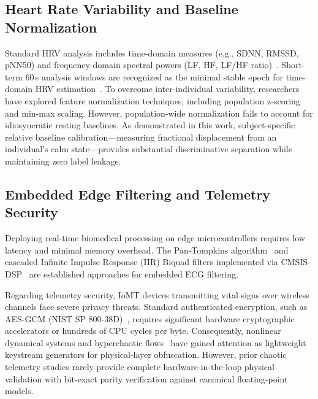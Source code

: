 \documentclass[conference]{IEEEtran}
\begin{document}
\subsection{Heart Rate Variability and Baseline Normalization}
Standard HRV analysis includes time-domain measures (e.g., SDNN, RMSSD, pNN50) and frequency-domain spectral powers (LF, HF, LF/HF ratio)~\cite{taskforce1996hrv,shaffer2017overview}. Short-term 60\,s analysis windows are recognized as the minimal stable epoch for time-domain HRV estimation~\cite{shaffer2017overview}. To overcome inter-individual variability, researchers have explored feature normalization techniques, including population z-scoring and min-max scaling. However, population-wide normalization fails to account for idiosyncratic resting baselines. As demonstrated in this work, subject-specific relative baseline calibration—measuring fractional displacement from an individual's calm state—provides substantial discriminative separation while maintaining zero label leakage.

\subsection{Embedded Edge Filtering and Telemetry Security}
Deploying real-time biomedical processing on edge microcontrollers requires low latency and minimal memory overhead. The Pan-Tompkins algorithm~\cite{pan1985realtime} and cascaded Infinite Impulse Response (IIR) Biquad filters implemented via CMSIS-DSP~\cite{arm2021cmsis} are established approaches for embedded ECG filtering. 

Regarding telemetry security, IoMT devices transmitting vital signs over wireless channels face severe privacy threats. Standard authenticated encryption, such as AES-GCM (NIST SP 800-38D)~\cite{dworkin2007recommendation}, requires significant hardware cryptographic accelerators or hundreds of CPU cycles per byte. Consequently, nonlinear dynamical systems and hyperchaotic flows~\cite{wolf1985determining,pecora1990synchronization,sprott1994some} have gained attention as lightweight keystream generators for physical-layer obfuscation. However, prior chaotic telemetry studies rarely provide complete hardware-in-the-loop physical validation with bit-exact parity verification against canonical floating-point models.

\end{document}
